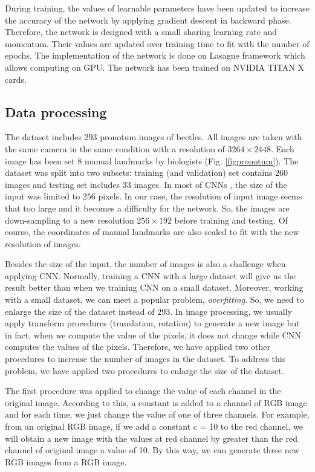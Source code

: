 \documentclass[10pt]{article}
\begin{document}
During training, the values of learnable parameters have been updated to increase the accuracy of the network by applying gradient descent in backward phase. Therefore, the network is designed with a small sharing learning rate and momentum. Their values are updated over training time to fit with the number of epochs. The implementation of the network is done on Lasagne framework \cite{lasagne} which allows computing on GPU. The network has been trained on NVIDIA TITAN X cards.

\subsection{Data processing}
The dataset includes $293$ pronotum images of beetles. All images are taken with the same camera in the same condition with a resolution of $3264 \times 2448$. Each image has been set $8$ manual landmarks by biologists (Fig. \ref{figpronotum}). The dataset was split into two subsets: training (and validation) set contains $260$ images and testing set includes $33$ images. In most of CNNs \cite{lecun2010convolutional, sun2013deep,  krizhevsky2012imagenet, cintas2016automatic}, the size of the input was limited to $256$ pixels. In our case, the resolution of input image seems that too large and it becomes a difficulty for the network. So, the images are down-sampling to a new resolution $256 \times 192$ before training and testing. Of course, the coordinates of manual landmarks are also scaled to fit with the new resolution of images.

Besides the size of the input, the number of images is also a challenge when applying CNN. Normally, training a CNN with a large dataset will give us the result better than when we training CNN on a small dataset. Moreover, working with a small dataset, we can meet a popular problem, \textit{overfitting}. So, we need to enlarge the size of the dataset instead of $293$. In image processing, we usually apply transform procedures (translation, rotation) to generate a new image but in fact, when we compute the value of the pixels, it does not change while CNN computes the values of the pixels. Therefore, we have applied two other procedures to increase the number of images in the dataset. To address this problem, we have applied two procedures to enlarge the size of the dataset.

The first procedure was applied to change the value of each
channel in the original image. According to this, a constant is
added to a channel of RGB image and for each time, we just
change the value of one of three channels. For example, from
an original RGB image, if we add a constant c = 10 to the
red channel, we will obtain a new image with the values at
red channel by greater than the red channel of original image
a value of 10. By this way, we can generate three new RGB
images from a RGB image.
\end{document}
